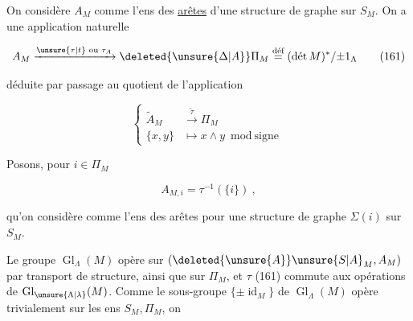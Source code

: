 
On considère $A_M$ comme l'ens des \uline{arêtes} d'une structure de graphe sur $S_M$.  On a une application naturelle

\[
 A_M \xrightarrow{\unsure{\tau|t}\text{ ou }\tau_A} \deleted{\unsure{\Delta|A}}\Pi_M \overset{\text{déf}}{=} (\text{dét}\,M)^*/{\pm 1_\Lambda}
 \tag*{(161)}
\]


déduite par passage au quotient de l'application

\[
 \left\{\begin{aligned}
  \widetilde A_M &\xrightarrow{\widetilde\tau} \Pi_M \\
  \{x,y\} &\longmapsto x\wedge y \bmod\text{signe}
 \end{aligned}\right.
 \tag*{(162)}
\]


Posons, pour $i\in\Pi_M$

\[
 A_{M,i}=\tau^{-1}(\{i\})\ , \tag*{(163)}
\]

qu'on considère comme l'ens des arêtes pour une structure de graphe  $\Sigma(i)$ sur $S_M$.

Le groupe $\operatorname{Gl}_\Lambda(M)$ opère sur $(\deleted{\unsure{A}}\unsure{S|A}_M,A_M)$ par transport de structure, ainsi que sur $\Pi_M$, et $\tau$ (161) commute aux opérations de $\operatorname{Gl}_{\unsure{\Lambda|\lambda}}(M)$. Comme le sous-groupe $\{\pm\operatorname{id}_M\}$ de $\operatorname{Gl}_\Lambda(M)$ opère trivialement sur les ens $S_M,\Pi_M$, on

